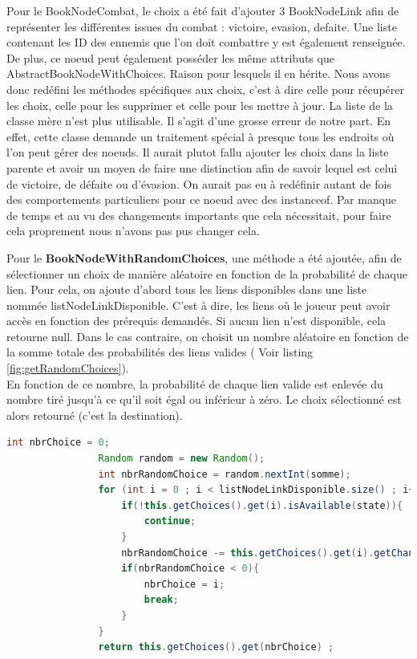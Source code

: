 			Pour le BookNodeCombat, le choix a été fait d'ajouter 3 BookNodeLink afin de représenter les différentes issues du combat : victoire, evasion, defaite. Une liste contenant les ID des ennemis que l'on doit combattre y est également renseignée. De plus, ce noeud peut également posséder les même attributs que AbstractBookNodeWithChoices. Raison pour lesquels il en hérite. Nous avons donc redéfini les méthodes spécifiques aux choix, c'est à dire celle pour récupérer les choix, celle pour les supprimer et celle pour les mettre à jour. La liste de la classe mère n'est plus utilisable. Il s'agit d'une grosse erreur de notre part. En effet, cette classe demande un traitement spécial à presque tous les endroits où l'on peut gérer des noeuds. Il aurait plutot fallu ajouter les choix dans la liste parente et avoir un moyen de faire une distinction afin de savoir lequel est celui de victoire, de défaite ou d'évasion. On aurait pas eu à redéfinir autant de fois des comportements particuliers pour ce noeud avec des instanceof. Par manque de temps et au vu des changements importants que cela nécessitait, pour faire cela proprement nous n'avons pas pus changer cela.

			Pour le \textbf{BookNodeWithRandomChoices}, une méthode a été ajoutée, afin de sélectionner un choix de manière aléatoire en fonction de la probabilité de chaque lien. Pour cela, on ajoute d'abord tous les liens disponibles dans une liste nommée listNodeLinkDisponible. C'est à dire, les liens où le joueur peut avoir accès en fonction des prérequis demandés. Si aucun lien n'est disponible, cela retourne null. Dans le cas contraire, on choisit un nombre aléatoire en fonction de la somme totale des probabilités des liens valides ( Voir listing \ref{fig:getRandomChoices}).\\
			En fonction de ce nombre, la probabilité de chaque lien valide est enlevée du nombre tiré jusqu'à ce qu'il soit égal ou inférieur à zéro. Le choix sélectionné est alors retourné (c'est la destination).

			\begin{lstlisting}[gobble=12, language=java, label=fig:getRandomChoices, caption=getRandomChoice()]
				int nbrChoice = 0;
				Random random = new Random();
				int nbrRandomChoice = random.nextInt(somme);
				for (int i = 0 ; i < listNodeLinkDisponible.size() ; i++){
					if(!this.getChoices().get(i).isAvailable(state)){
						continue;
					}
					nbrRandomChoice -= this.getChoices().get(i).getChance();
					if(nbrRandomChoice < 0){
						nbrChoice = i;
						break;
					}
				}
				return this.getChoices().get(nbrChoice) ;
			\end{lstlisting}



